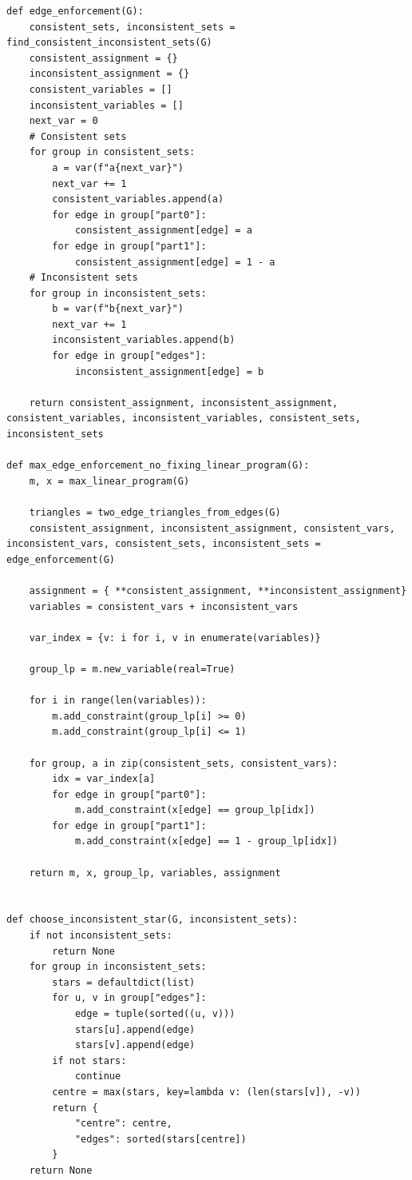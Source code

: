 \begin{lstlisting}[style=python, caption={Max Edge Enforcment Linear Program.}, label={lst::max_edge_enforcement_linear_program}]
def edge_enforcement(G):
    consistent_sets, inconsistent_sets = find_consistent_inconsistent_sets(G)
    consistent_assignment = {}
    inconsistent_assignment = {}
    consistent_variables = []
    inconsistent_variables = []
    next_var = 0
    # Consistent sets
    for group in consistent_sets:
        a = var(f"a{next_var}")
        next_var += 1
        consistent_variables.append(a)
        for edge in group["part0"]:
            consistent_assignment[edge] = a
        for edge in group["part1"]:
            consistent_assignment[edge] = 1 - a
    # Inconsistent sets
    for group in inconsistent_sets:
        b = var(f"b{next_var}")
        next_var += 1
        inconsistent_variables.append(b)
        for edge in group["edges"]:
            inconsistent_assignment[edge] = b

    return consistent_assignment, inconsistent_assignment, consistent_variables, inconsistent_variables, consistent_sets, inconsistent_sets

def max_edge_enforcement_no_fixing_linear_program(G):
    m, x = max_linear_program(G)

    triangles = two_edge_triangles_from_edges(G)
    consistent_assignment, inconsistent_assignment, consistent_vars, inconsistent_vars, consistent_sets, inconsistent_sets = edge_enforcement(G)

    assignment = { **consistent_assignment, **inconsistent_assignment}
    variables = consistent_vars + inconsistent_vars

    var_index = {v: i for i, v in enumerate(variables)}

    group_lp = m.new_variable(real=True)

    for i in range(len(variables)):
        m.add_constraint(group_lp[i] >= 0)
        m.add_constraint(group_lp[i] <= 1)

    for group, a in zip(consistent_sets, consistent_vars):
        idx = var_index[a]
        for edge in group["part0"]:
            m.add_constraint(x[edge] == group_lp[idx])
        for edge in group["part1"]:
            m.add_constraint(x[edge] == 1 - group_lp[idx])

    return m, x, group_lp, variables, assignment


def choose_inconsistent_star(G, inconsistent_sets):
    if not inconsistent_sets:
        return None
    for group in inconsistent_sets:
        stars = defaultdict(list)
        for u, v in group["edges"]:
            edge = tuple(sorted((u, v)))
            stars[u].append(edge)
            stars[v].append(edge)
        if not stars:
            continue
        centre = max(stars, key=lambda v: (len(stars[v]), -v))
        return {
            "centre": centre,
            "edges": sorted(stars[centre])
        }
    return None


\end{lstlisting}
